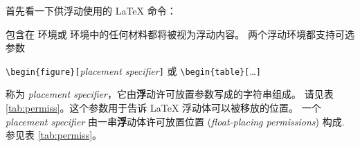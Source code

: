 \bigskip
首先看一下供浮动使用的 \LaTeX{} 命令：

包含在  环境或  环境中的任何材料都将被视为浮动内容。
两个浮动环境都支持可选参数
\begin{lscommand}
\verb|\begin{figure}[|\emph{placement specifier}\verb|]| 或 \verb|\begin{table}[|\ldots\verb|]|
\end{lscommand}
\noindent 称为 \emph{placement specifier}，它由{\textbf
浮动许可放置参数}写成的字符串组成。
请见表 \ref{tab:permiss}。这个参数用于告诉
 \LaTeX{} 浮动体可以被移放的位置。 一个 \emph{placement
specifier} 由一串{\textbf 浮动体许可放置位置} (\emph{float-placing
permissions}) 构成. 参见表 \ref{tab:permiss}。

